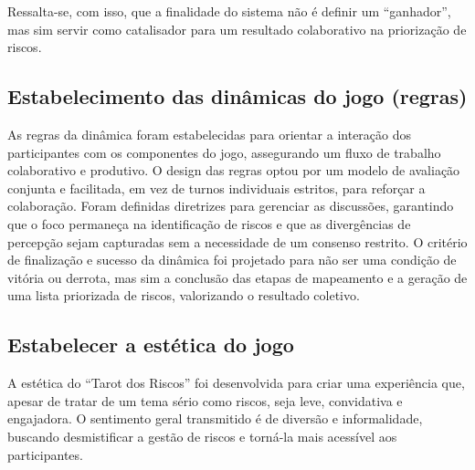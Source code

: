 \documentclass[
	12pt,
	openright,
	twoside,
	a4paper,
	english,
	brazil
	]{abntex2}
\begin{document}
Ressalta-se, com isso, que a finalidade do sistema não é definir um “ganhador”, mas sim servir como catalisador para um resultado colaborativo na priorização de riscos.

\subsection{Estabelecimento das dinâmicas do jogo (regras)}
\label{sec:dinamicas-regras}

As regras da dinâmica foram estabelecidas para orientar a interação dos participantes com os componentes do jogo, assegurando um fluxo de trabalho colaborativo e produtivo. O design das regras optou por um modelo de avaliação conjunta e facilitada, em vez de turnos individuais estritos, para reforçar a colaboração. Foram definidas diretrizes para gerenciar as discussões, garantindo que o foco permaneça na identificação de riscos e que as divergências de percepção sejam capturadas sem a necessidade de um consenso restrito. O critério de finalização e sucesso da dinâmica foi projetado para não ser uma condição de vitória ou derrota, mas sim a conclusão das etapas de mapeamento e a geração de uma lista priorizada de riscos, valorizando o resultado coletivo.

\subsection{Estabelecer a estética do jogo}
\label{sec:estetica-jogo}

A estética do “Tarot dos Riscos” foi desenvolvida para criar uma experiência que, apesar de tratar de um tema sério como riscos, seja leve, convidativa e engajadora. O sentimento geral transmitido é de diversão e informalidade, buscando desmistificar a gestão de riscos e torná-la mais acessível aos participantes.
\end{document}
